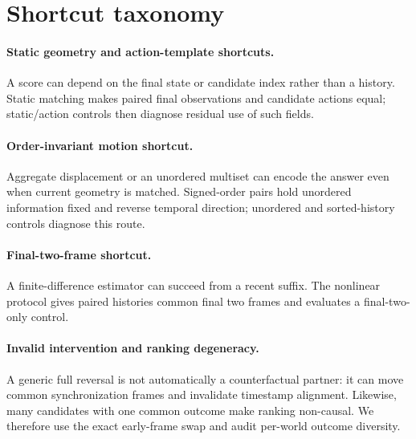 \section{Shortcut taxonomy}
\paragraph{Static geometry and action-template shortcuts.} A score can depend on the final state or candidate index rather than a history. Static matching makes paired final observations and candidate actions equal; static/action controls then diagnose residual use of such fields.
\paragraph{Order-invariant motion shortcut.} Aggregate displacement or an unordered multiset can encode the answer even when current geometry is matched. Signed-order pairs hold unordered information fixed and reverse temporal direction; unordered and sorted-history controls diagnose this route.
\paragraph{Final-two-frame shortcut.} A finite-difference estimator can succeed from a recent suffix. The nonlinear protocol gives paired histories common final two frames and evaluates a final-two-only control.
\paragraph{Invalid intervention and ranking degeneracy.} A generic full reversal is not automatically a counterfactual partner: it can move common synchronization frames and invalidate timestamp alignment. Likewise, many candidates with one common outcome make ranking non-causal. We therefore use the exact early-frame swap and audit per-world outcome diversity.

